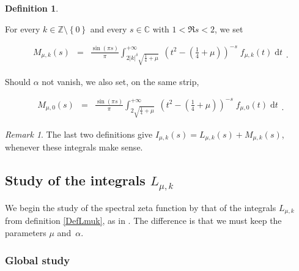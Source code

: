 \documentclass{jams-l}
\theoremstyle{definition}
\newtheorem{definition}[theorem]{Definition}
\theoremstyle{remark}
\newtheorem{remark}[theorem]{Remark}
\numberwithin{equation}{section}
\begin{document}
        \begin{definition}
        \label{DefMmuk}
        
            For every $k \in \mathbb{Z} \setminus \left \{ 0 \right \}$ and every $s \in \mathbb{C}$ with $1 < \Re s < 2$, we set
            
            \[ \begin{array}{lll}
                    M_{\mu,k} \left( s \right) & = & \displaystyle \frac{\sin \left( \pi s \right)}{\pi} \int_{2 \left \vert k \right \vert^{\delta} \sqrt{\frac{1}{4} + \mu}}^{+ \infty} \; \left( t^2 - \left( \frac{1}{4} + \mu \right) \right)^{-s} \; f_{\mu,k} \left( t \right) \; \text{d}t
                \end{array} . \]
            
            \noindent Should $\alpha$ not vanish, we also set, on the same strip,
            
            \[ \begin{array}{lll}
                    M_{\mu,0} \left( s \right) & = & \displaystyle \frac{\sin \left( \pi s \right)}{\pi} \int_{2 \sqrt{\frac{1}{4} + \mu}}^{+ \infty} \; \left( t^2 - \left( \frac{1}{4} + \mu \right) \right)^{-s} \; f_{\mu,0} \left( t \right) \; \text{d}t
                \end{array} . \]
        
        \end{definition}
        
        \begin{remark}
        
            The last two definitions give $I_{\mu,k} \left( s \right) = L_{\mu,k} \left( s \right) + M_{\mu,k} \left( s \right)$, whenever these integrals make sense.
        
        \end{remark}
        
    
    \subsection{\texorpdfstring{Study of the integrals $L_{\mu,k}$}{Study of the integrals Lmu,k}}
    \label{SubSecStudyLmuk}
        
        We begin the study of the spectral zeta function by that of the integrals $L_{\mu,k}$ from definition \ref{DefLmuk}, as in \cite[Sec. 6.2]{MR4167014}. The difference is that we must keep the parameters $\mu$ and~$\alpha$.
        
        \subsubsection{Global study}
        \label{SubSubSecGlobalStudy}
        
\end{document}
